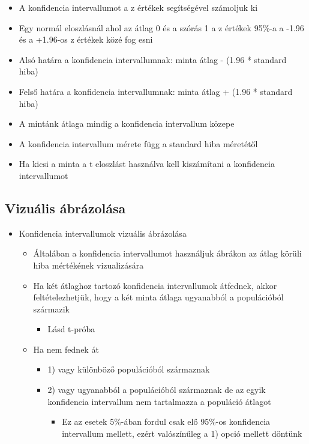 \documentclass[
  letterpaper,
  DIV=11,
  numbers=noendperiod]{scrreprt}
\providecommand{\tightlist}{%
  \setlength{\itemsep}{0pt}\setlength{\parskip}{0pt}}\usepackage{longtable,booktabs,array}
\begin{document}
\begin{itemize}
\item
  A konfidencia intervallumot a z értékek segítségével számoljuk ki
\item
  Egy normál eloszlásnál ahol az átlag 0 és a szórás 1 a z értékek
  95\%-a a -1.96 és a +1.96-os z értékek közé fog esni
\item
  Alsó határa a konfidencia intervallumnak: minta átlag - (1.96 *
  standard hiba)
\item
  Felső határa a konfidencia intervallumnak: minta átlag + (1.96 *
  standard hiba)
\item
  A mintánk átlaga mindig a konfidencia intervallum közepe
\item
  A konfidencia intervallum mérete függ a standard hiba méretétől
\item
  Ha kicsi a minta a t eloszlást használva kell kiszámítani a
  konfidencia intervallumot
\end{itemize}

\hypertarget{vizuuxe1lis-uxe1bruxe1zoluxe1sa}{%
\subsection{Vizuális ábrázolása}\label{vizuuxe1lis-uxe1bruxe1zoluxe1sa}}

\begin{itemize}
\item
  Konfidencia intervallumok vizuális ábrázolása

  \begin{itemize}
  \item
    Általában a konfidencia intervallumot használjuk ábrákon az átlag
    körüli hiba mértékének vizualizására
  \item
    Ha két átlaghoz tartozó konfidencia intervallumok átfednek, akkor
    feltételezhetjük, hogy a két minta átlaga ugyanabból a populációból
    származik

    \begin{itemize}
    \tightlist
    \item
      Lásd t-próba
    \end{itemize}
  \item
    Ha nem fednek át

    \begin{itemize}
    \item
      1) vagy különböző populációból származnak
    \item
      2) vagy ugyanabból a populációból származnak de az egyik
      konfidencia intervallum nem tartalmazza a populáció átlagot

      \begin{itemize}
      \tightlist
      \item
        Ez az esetek 5\%-ában fordul csak elő 95\%-os konfidencia
        intervallum mellett, ezért valószínűleg a 1) opció mellett
        döntünk
      \end{itemize}
    \end{itemize}
  \end{itemize}
\end{itemize}
\end{document}
